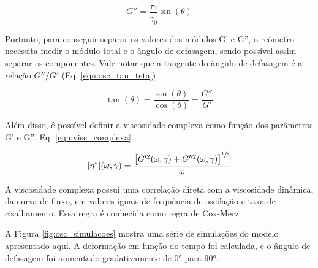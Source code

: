 			\begin{equation} 
				G'' = \dfrac{\tau_0}{\gamma_0} \sin(\theta)
				\label{eqn:osc_g2linha}
			\end{equation} 
			
			Portanto, para conseguir separar os valores dos módulos G' e G'', o reômetro necessita medir o módulo total e o ângulo de defasagem, sendo possível assim separar os componentes. Vale notar que a tangente do ângulo de defasagem é a relação \(G''/G'\) (Eq. \ref{eqn:osc_tan_teta})
			
			
			\begin{equation}
				\tan(\theta) = \dfrac{\sin(\theta)}{\cos(\theta)} = \dfrac{G''}{G'}
				\label{eqn:osc_tan_teta}
			\end{equation}
			
			Além disso, é possível definir a viscosidade complexa como função dos parâmetros G' e G'', Eq. \ref{eqn:visc_complexa}.
			
			\begin{equation} 
				| \eta^* |(\omega, \gamma) = \dfrac{\left[ G'^2(\omega, \gamma) + G''^2(\omega, \gamma) \right] ^ {\sfrac{1}{2}}} {\omega}
				\label{eqn:visc_complexa}
			\end{equation}  %
			
			A viscosidade complexa possui uma correlação direta com a viscosidade dinâmica, da curva de fluxo, em valores iguais de frequência de oscilação e taxa de cisalhamento. Essa regra é conhecida como regra de Cox-Merz. %
			
			A Figura \ref{fig:osc_simulacoes} mostra uma série de simulações do modelo apresentado aqui. A deformação em função do tempo foi calculada, e o ângulo de defasagem foi aumentado gradativamente de 0° para 90°. 

